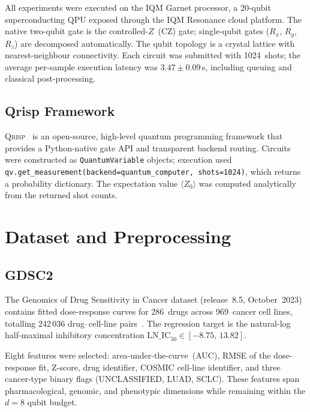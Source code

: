 \documentclass[twocolumn,aps,pra,superscriptaddress,floatfix]{revtex4-2}
\newcommand{\qrisp}{\textsc{Qrisp}}
\newcommand{\iqm}{\textsc{IQM}}
\newcommand{\expvz}{\ensuremath{\langle Z_0 \rangle}}
\begin{document}
All experiments were executed on the \iqm{} Garnet processor, a 20-qubit
superconducting QPU exposed through the \iqm{} Resonance cloud platform.
The native two-qubit gate is the controlled-$Z$~(CZ) gate; single-qubit
gates ($R_x$, $R_y$, $R_z$) are decomposed automatically.
The qubit topology is a crystal lattice with nearest-neighbour connectivity.
Each circuit was submitted with 1024~shots; the average per-sample execution
latency was $3.47\pm0.09$\,s, including queuing and classical post-processing.

\subsection{Qrisp Framework}

\qrisp{}~\cite{qrisp2024} is an open-source, high-level quantum programming
framework that provides a Python-native gate API and transparent backend
routing.
Circuits were constructed as \texttt{QuantumVariable} objects; execution used
\texttt{qv.get\_measurement(backend=quantum\_computer, shots=1024)}, which
returns a probability dictionary.
The expectation value $\expvz$ was computed analytically from the returned
shot counts.

\section{Dataset and Preprocessing}
\label{sec:data}

\subsection{GDSC2}

The Genomics of Drug Sensitivity in Cancer dataset (release~8.5, October~2023)
contains fitted dose-response curves for 286~drugs across 969~cancer cell
lines, totalling 242\,036 drug--cell-line pairs~\cite{iorio2016}.
The regression target is the natural-log half-maximal inhibitory concentration
$\text{LN\_IC}_{50}\in[-8.75,\,13.82]$.

Eight features were selected: area-under-the-curve~(AUC), RMSE of the
dose-response fit, Z-score, drug identifier, COSMIC cell-line identifier, and
three cancer-type binary flags (UNCLASSIFIED, LUAD, SCLC).
These features span pharmacological, genomic, and phenotypic dimensions while
remaining within the $d=8$ qubit budget.
\end{document}
